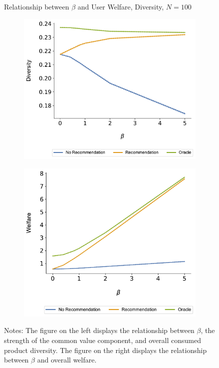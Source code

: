 \documentclass[format=acmsmall, review=true]{acmart}
\begin{document}
\begin{figure}[ht]
\caption{Relationship between $\beta$ and User Welfare, Diversity, $N = 100$}\label{fig:diversity_welfare_correlation}
\begin{subfigure}{.45\linewidth}
  \includegraphics[width=.8\linewidth]{figures/beta_diversity_N_100_T_20.pdf}
\end{subfigure}
\ContinuedFloat
\begin{subfigure}{.45\linewidth}
  \includegraphics[width=.8\linewidth]{figures/beta_welfare_N_100_T_20.pdf}
\end{subfigure}
\caption*{\scriptsize Notes: The figure on the left displays the relationship between $\beta$, the strength of the common value component, and overall consumed product diversity. The figure on the right displays the relationship between $\beta$ and overall welfare.}
\end{figure}
\end{document}
